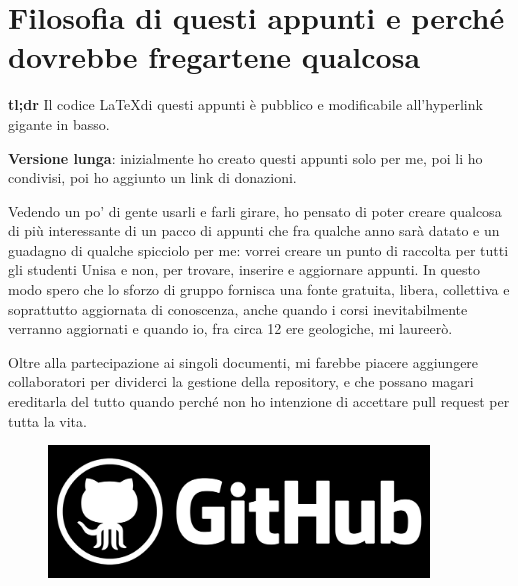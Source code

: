    \vspace{3mm}
    \section{Filosofia di questi appunti e perché dovrebbe fregartene qualcosa}
        \textbf{tl;dr} Il codice \LaTeX di questi appunti è pubblico e modificabile all'hyperlink gigante in basso.
        
        \textbf{Versione lunga}: inizialmente ho creato questi appunti solo per me, poi li ho condivisi, poi ho aggiunto un link di donazioni.
        
        Vedendo un po' di gente usarli e farli girare, ho pensato di poter creare qualcosa di più interessante di un pacco di appunti che fra qualche anno sarà datato e un guadagno di qualche spicciolo per me: vorrei creare un punto di raccolta per tutti gli studenti Unisa e non, per trovare, inserire e aggiornare appunti. In questo modo spero che lo sforzo di gruppo fornisca una fonte gratuita, libera, collettiva e soprattutto aggiornata di conoscenza, anche quando i corsi inevitabilmente verranno aggiornati e quando io, fra circa 12 ere geologiche, mi laureerò.
        
        \vspace{3mm}
        
        Oltre alla partecipazione ai singoli documenti, mi farebbe piacere aggiungere collaboratori per dividerci la gestione della repository, e che possano magari ereditarla del tutto quando perché non ho intenzione di accettare pull request per tutta la vita.
    \begin{figure}[h]
        \centering
        \href{https://github.com/shyimon/UnisaComeBabele}
        {\includegraphics[width=0.9\textwidth]{Images/github.png}}
    \end{figure}